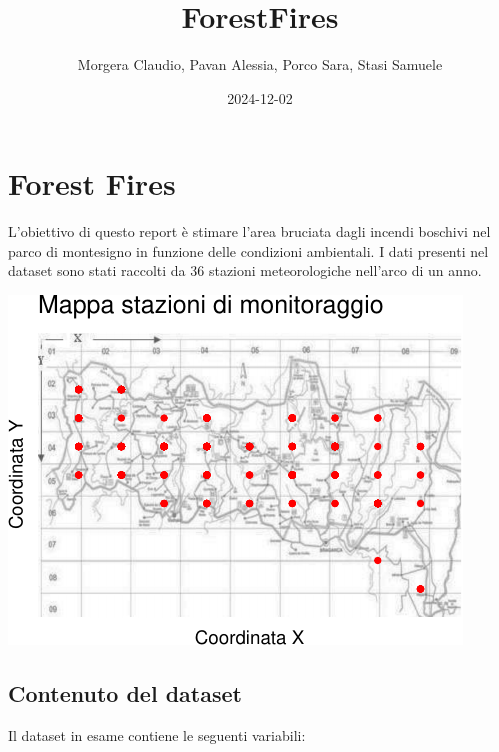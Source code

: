 \documentclass[
]{article}
\title{ForestFires}
\author{Morgera Claudio, Pavan Alessia, Porco Sara, Stasi Samuele}
\date{2024-12-02}
\begin{document}
\maketitle

\section{Forest Fires}\label{forest-fires}

L'obiettivo di questo report è stimare l'area bruciata dagli incendi
boschivi nel parco di montesigno in funzione delle condizioni
ambientali. I dati presenti nel dataset sono stati raccolti da 36
stazioni meteorologiche nell'arco di un anno. \newline

\begin{center}\includegraphics{ForestFires_files/figure-latex/mappa-1} \end{center}

\subsection{Contenuto del dataset}\label{contenuto-del-dataset}

Il dataset in esame contiene le seguenti variabili:
\end{document}

